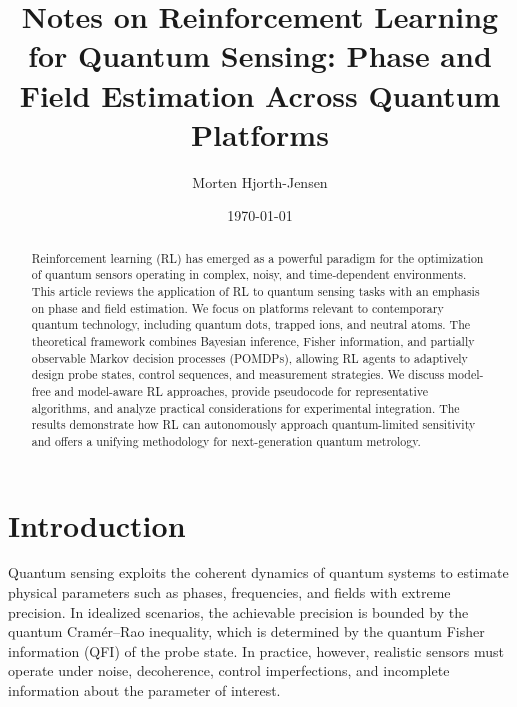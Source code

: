 \documentclass[
    aps,
    prx,
    reprint,
    superscriptaddress,
    amsmath,
    amssymb,
    longbibliography
]{revtex4-2}
\begin{document}
\title{Notes on Reinforcement Learning for Quantum Sensing: Phase and Field Estimation Across Quantum Platforms}

\author{Morten Hjorth-Jensen }

\date{\today}

\begin{abstract}
Reinforcement learning (RL) has emerged as a powerful paradigm for the
optimization of quantum sensors operating in complex, noisy, and
time-dependent environments. This article reviews the application of RL
to quantum sensing tasks with an emphasis on phase and field estimation.
We focus on platforms relevant to contemporary quantum technology,
including quantum dots, trapped ions, and neutral atoms. The theoretical
framework combines Bayesian inference, Fisher information, and
partially observable Markov decision processes (POMDPs), allowing RL
agents to adaptively design probe states, control sequences, and
measurement strategies. We discuss model-free and model-aware RL
approaches, provide pseudocode for representative algorithms, and
analyze practical considerations for experimental integration. The
results demonstrate how RL can autonomously approach quantum-limited
sensitivity and offers a unifying methodology for next-generation
quantum metrology.
\end{abstract}

\maketitle

\section{Introduction}

Quantum sensing exploits the coherent dynamics of quantum systems to
estimate physical parameters such as phases, frequencies, and fields
with extreme precision. In idealized scenarios, the achievable
precision is bounded by the quantum Cram\'er--Rao inequality, which is
determined by the quantum Fisher information (QFI) of the probe state.
In practice, however, realistic sensors must operate under noise,
decoherence, control imperfections, and incomplete information about
the parameter of interest.
\end{document}
